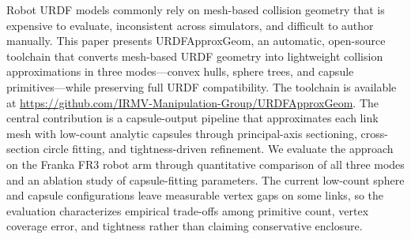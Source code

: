 Robot URDF models commonly rely on mesh-based collision geometry that is expensive to evaluate, inconsistent across simulators, and difficult to author manually. This paper presents URDFApproxGeom, an automatic, open-source toolchain that converts mesh-based URDF geometry into lightweight collision approximations in three modes---convex hulls, sphere trees, and capsule primitives---while preserving full URDF compatibility. The toolchain is available at \url{https://github.com/IRMV-Manipulation-Group/URDFApproxGeom}. The central contribution is a capsule-output pipeline that approximates each link mesh with low-count analytic capsules through principal-axis sectioning, cross-section circle fitting, and tightness-driven refinement. We evaluate the approach on the Franka FR3 robot arm through quantitative comparison of all three modes and an ablation study of capsule-fitting parameters. The current low-count sphere and capsule configurations leave measurable vertex gaps on some links, so the evaluation characterizes empirical trade-offs among primitive count, vertex coverage error, and tightness rather than claiming conservative enclosure.
